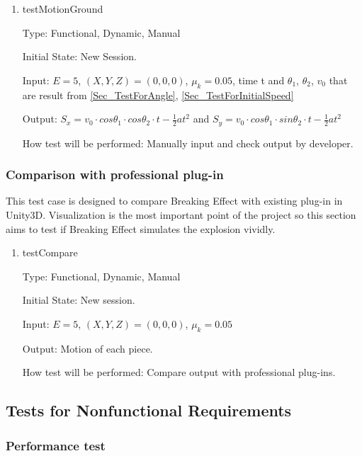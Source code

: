 \documentclass[12pt, titlepage]{article}
\begin{document}
\begin{enumerate}

\item{testMotionGround\\}

Type: Functional, Dynamic, Manual

Initial State: New Session.

Input: $E = 5$, $(X,Y,Z) = (0,0,0)$, $\mu_{k} = 0.05$, time t and $\theta_{1}$, $\theta_{2}$, $v_{0}$ that are result from \ref{Sec_TestForAngle}, \ref{Sec_TestForInitialSpeed}

Output: $S_{x}=v_{0}\cdot cos\theta _{1}\cdot cos\theta _{2}\cdot t-\frac{1}{2}at^{2}$ and $S_{y}=v_{0}\cdot cos\theta _{1}\cdot sin\theta _{2}\cdot t-\frac{1}{2}at^{2}$

How test will be performed: Manually input and check output by developer.

\end{enumerate}

\subsubsection{Comparison with professional plug-in}

This test case is designed to compare Breaking Effect with existing plug-in in Unity3D. Visualization is the most important point of the project so this section aims to test if Breaking Effect simulates the explosion vividly. 

\begin{enumerate}

\item{testCompare\\}

Type: Functional, Dynamic, Manual

Initial State: New session.

Input: $E = 5$, $(X,Y,Z) = (0,0,0)$, $\mu_{k} = 0.05$ 

Output: Motion of each piece.

How test will be performed: Compare output with professional plug-ins. 

\end{enumerate}

\subsection{Tests for Nonfunctional Requirements}

\subsubsection{Performance test}
\end{document}
